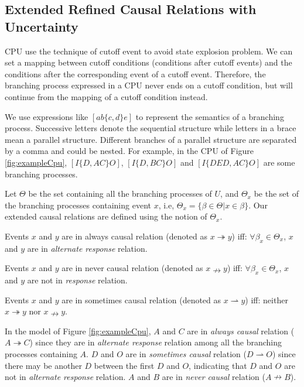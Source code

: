 \documentclass[dvips,...]{llncs}
\begin{document}
\subsection{Extended Refined Causal Relations with Uncertainty}\label{subsec:causalAndInverseCausal}
CPU use the technique of cutoff event to avoid state explosion problem. We can set a mapping between cutoff conditions (conditions after cutoff events) and the conditions after the corresponding event of a cutoff event. Therefore, the branching process expressed in a CPU never ends on a cutoff condition, but will continue from the mapping of a cutoff condition instead.

We use expressions like $[ab\{c,d\}e]$ to represent the semantics of a branching process. Successive letters denote the sequential structure while letters in a brace mean a parallel structure. Different branches of a parallel structure are separated by a comma and could be nested. For example, in the CPU of Figure \ref{fig:exampleCpu}, $[I\{D,AC\}O]$, $[I\{D,BC\}O]$ and $[I\{DED,AC\}O]$ are some branching processes.

Let $\Theta$ be the set containing all the branching processes of $U$, and $\Theta_{x}$ be the set of the branching processes containing event $x$, i.e, $\Theta_{x}=\{\beta\in\Theta|x\in\beta\}$. Our extended causal relations are defined using the notion of $\Theta_{x}$.

\begin{definition}\label{def:alwaysCausal}
Events $x$ and $y$ are in always causal relation (denoted as $x\twoheadrightarrow y$) iff: $\forall\beta_{x}\in\Theta_{x}$, $x$ and $y$ are in \textit{alternate response} relation.
\end{definition}

\begin{definition}\label{def:neverCausal}
Events $x$ and $y$ are in never causal relation (denoted as $x\nrightarrow y$) iff: $\forall\beta_{x}\in\Theta_{x}$, $x$ and $y$ are not in \textit{response} relation.
\end{definition}

\begin{definition}\label{def:sometimesCausal}
Events $x$ and $y$ are in sometimes causal relation (denoted as $x\rightharpoonup y$) iff: neither $x\twoheadrightarrow y$ nor $x\nrightarrow y$.
\end{definition}

\begin{example}\label{ex:causalRelation}
In the model of Figure \ref{fig:exampleCpu}, $A$ and $C$ are in \textit{always causal} relation ($A\twoheadrightarrow C$) since they are in \textit{alternate response} relation among all the branching processes containing $A$. $D$ and $O$ are in \textit{sometimes causal} relation ($D\rightharpoonup O$) since there may be another $D$ between the first $D$ and $O$, indicating that $D$ and $O$ are not in \textit{alternate response} relation. $A$ and $B$ are in \textit{never causal} relation ($A\nrightarrow B$).
\end{example}
\end{document}
